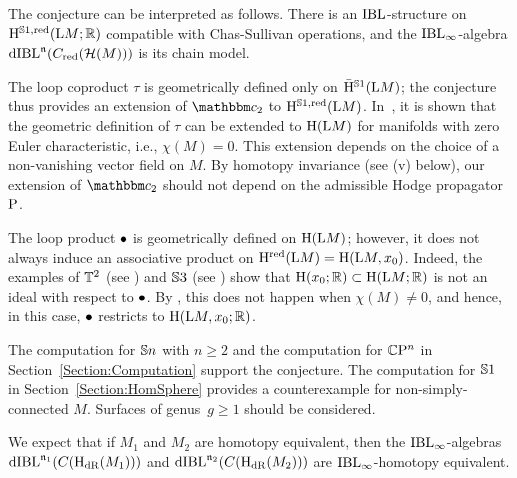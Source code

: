 \documentclass[\MainFolder/Text.tex]{subfiles}
\begin{document}
\begin{Remark}
\begin{RemarkList}
\item The conjecture can be interpreted as follows. There is an $\mathrm{IBL}$-structure on $\mathrm{H}^{\mathbb{S}{1}, \mathrm{red}}(\mathrm{L} M;\mathbb{R})$ compatible with Chas-Sullivan operations, and the $\mathrm{IBL}_\infty$-algebra $\mathrm{dIBL}^{\mathfrak{n}}(C_{\mathrm{red}}(\mathcal{H}(M)))$ is its chain model.
\item The loop coproduct $\tau$ is geometrically defined only on $\bar{\mathrm{H}}^{\mathbb{S}{1}}(\mathrm{L} M)$; the conjecture thus provides an extension of $\StringCoOp_2$ to $\mathrm{H}^{\mathbb{S}{1}, \mathrm{red}}(\mathrm{L} M)$. In~\cite{Basu2011}, it is shown that the geometric definition of $\tau$ can be extended to $\mathrm{H}(\mathrm{L} M)$ for manifolds with zero Euler characteristic, i.e., $\chi(M) = 0$. This extension depends on the choice of a non-vanishing vector field on $M$. By homotopy invariance (see (v) below), our extension of $\StringCoOp_2$ should not depend on the admissible Hodge propagator $\mathrm{P}$.
\item The loop product $\bullet$ is geometrically defined on $\mathrm{H}(\mathrm{L} M)$; however, it does not always induce an associative product on $\mathrm{H}^{\mathrm{red}}(\mathrm{L} M) = \mathrm{H}(\mathrm{L} M, x_0)$. Indeed, the examples of $\mathbb{T}^2$ (see \cite{Basu2011}) and $\mathbb{S}{3}$ (see \cite{Sullivan1999}) show that $\mathrm{H}(x_0;\mathbb{R}) \subset \mathrm{H}(\mathrm{L} M;\mathbb{R})$ is not an ideal with respect to $\bullet$. By \cite{Tamanoi2010}, this does not happen when $\chi(M) \neq 0$, and hence, in this case, $\bullet$ restricts to $\mathrm{H}(\mathrm{L} M, x_0; \mathbb{R})$.
\item The computation for $\mathbb{S}{n}$ with $n\ge 2$ and the computation for $\mathbb{C}\mathrm{P}^n$ in Section~\ref{Section:Computation} support the conjecture. The computation for $\mathbb{S}{1}$ in Section~\ref{Section:HomSphere} provides a counterexample for non-simply-connected $M$. Surfaces of genus~$g\ge 1$ should be considered.

\item  We expect that if $M_1$ and $M_2$ are homotopy equivalent, then the $\mathrm{IBL}_\infty$-algebras $\mathrm{dIBL}^{\mathfrak{n}_1}(C(\mathrm{H}_{\mathrm{dR}}(M_1)))$ and $\mathrm{dIBL}^{\mathfrak{n}_2}(C(\mathrm{H}_{\mathrm{dR}}(M_2)))$ are $\mathrm{IBL}_\infty$-homotopy equivalent.
\qedhere
\end{RemarkList}
\end{Remark}
\end{document}
